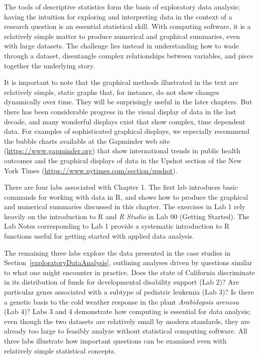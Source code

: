 The tools of descriptive statistics form the basis of exploratory data analysis; having the intuition for exploring and interpreting data in the context of a research question is an essential statistical skill. With computing software, it is a relatively simple matter to produce numerical and graphical summaries, even with large datasets. The challenge lies instead in understanding how to wade through a dataset, disentangle complex relationships between variables, and piece together the underlying story. 

It is important to note that the graphical methods illustrated in the text are relatively simple, static graphs that, for instance, do not show changes dynamically over time. They will be surprisingly useful in the later chapters. But there has been considerable progress in the visual display of data in the last decade, and many wonderful displays exist that show complex, time dependent data.  For examples of sophisticated graphical displays, we especially recommend the bubble charts available at the Gapminder web site (\url{https://www.gapminder.org}) that show international trends in public health outcomes and the graphical displays of data in the Upshot section of the New York Times (\url{https://www.nytimes.com/section/upshot}).

There are four labs associated with Chapter 1.  The first lab introduces basic commands for working with data in \textsf{R}, and shows how to produce the graphical and numerical summaries discussed in this chapter.  The exercises in Lab 1 rely heavily on the introduction to \textsf{R} and \textit{R Studio} in Lab 00 (Getting Started). The Lab Notes corresponding to Lab 1 provide a systematic introduction to \textsf{R} functions useful for getting started with applied data analysis.

The remaining three labs explore the data presented in the case studies in Section~\ref{exploratoryDataAnalysis}, outlining analyses driven by questions similar to what one might encounter in practice.  Does the state of California discriminate in its distribution of funds for developmental disability support (Lab 2)?  Are particular genes associated with a subtype of pediatric leukemia (Lab 3)?  Is there a genetic basis to the cold weather response in the plant \textit{Arabidopsis arenosa} (Lab 4)? Labs 3 and 4 demonstrate how computing is essential for data analysis; even though the two datasets are relatively small by modern standards, they are already too large to feasibly analyze without statistical computing software. All three labs illustrate how important questions can be examined even with relatively simple statistical concepts.


